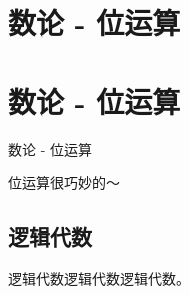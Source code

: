 
\def\sectionName{数论 - 位运算}



\isBeamerMode\relax
    \section[\TOCName]{\sectionName}
\fi
\isBeamerMode\relax
    \section[\TOCName\ -\ \sectionName]{\sectionName}
\fi

\begin{frame}

\isBeamerMode\relax
    {\Huge \sectionName}\par
\fi




位运算很巧妙的～



\end{frame}

\subsection{逻辑代数}
\begin{frame} %
逻辑代数逻辑代数逻辑代数。
\end{frame}



